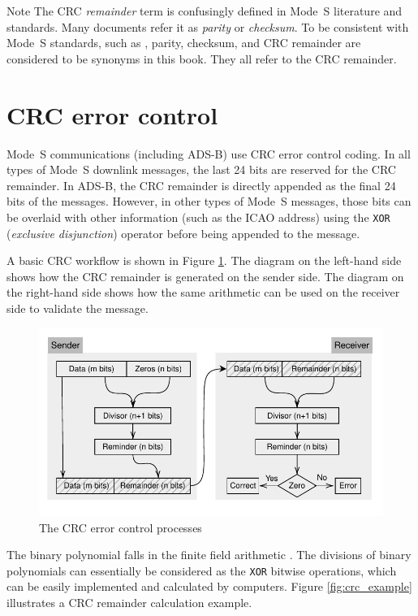 \begin{notebox}{Note}
The CRC \emph{remainder} term is confusingly defined in Mode~S literature and standards. Many documents refer it as \emph{parity} or \emph{checksum}. To be consistent with Mode~S standards, such as \cite{icao9871v1, rtca2011mops}, parity, checksum, and CRC remainder are considered to be synonyms in this book. They all refer to the CRC remainder.
\end{notebox}

\section{CRC error control}

Mode~S communications (including ADS-B) use CRC error control coding. In all types of Mode~S downlink messages, the last 24 bits are reserved for the CRC remainder. In ADS-B, the CRC remainder is directly appended as the final 24 bits of the messages. However, in other types of Mode~S messages, those bits can be overlaid with other information (such as the ICAO address) using the \texttt{XOR} (\emph{exclusive disjunction}) operator before being appended to the message.

A basic CRC workflow is shown in Figure \ref{fig:crc_flow}. The diagram on the left-hand side shows how the CRC remainder is generated on the sender side. The diagram on the right-hand side shows how the same arithmetic can be used on the receiver side to validate the message.

\begin{figure}[ht]
  \includegraphics[scale=0.9]{figures/crc/crc_flow.pdf}
  \caption{The CRC error control processes}
  \label{fig:crc_flow}
\end{figure}


The binary polynomial falls in the finite field arithmetic \cite{carlitz1932}. The divisions of binary polynomials can essentially be considered as the \texttt{XOR} bitwise operations, which can be easily implemented and calculated by computers. Figure \ref{fig:crc_example} illustrates a CRC remainder calculation example.

